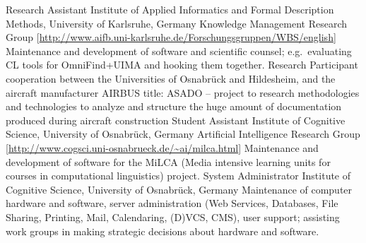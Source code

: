 \documentclass[11pt,a4paper]{moderncv}
\begin{document}
        {Research Assistant}
        {Institute of Applied Informatics and Formal Description Methods,
        University of Karlsruhe, Germany} {\small Knowledge Management Research
        Group}
        {[\url{http://www.aifb.uni-karlsruhe.de/Forschungsgruppen/WBS/english}]}
        {Maintenance and development of software and scientific counsel;
        e.g.~evaluating CL tools for OmniFind+UIMA and hooking them together.}
        {Research Participant}
        {cooperation between the Universities of Osnabr\"{u}ck and Hildesheim,
        and the aircraft manufacturer AIRBUS}
        {\small title: ASADO -- project to research methodologies and
        technologies to analyze and structure the huge amount of documentation
        produced during aircraft construction}
        {}{}
        {Student Assistant}
        {Institute of Cognitive Science, University of Osnabr\"{u}ck, Germany}
        {\small Artificial Intelligence Research Group}
        {[\url{http://www.cogsci.uni-osnabrueck.de/~ai/milca.html}]}
        {Maintenance and development of software for the MiLCA (Media intensive
        learning units for courses in computational linguistics) project.}
        {System Administrator}
        {Institute of Cognitive Science, University of Osnabr\"{u}ck, Germany}
        {}
        {}
        {Maintenance of computer hardware and software, server administration
        (Web Services, Databases, File Sharing, Printing, Mail, Calendaring,
        (D)VCS, CMS), user support; assisting work groups in making strategic
        decisions about hardware and software.}
\closesection{}


\end{document}
